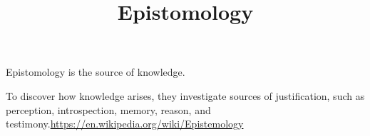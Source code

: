 \documentclass[a4paper]{article}
\title{Epistomology}
\date{}
\begin{document}
    \maketitle
    Epistomology is the source of knowledge.
    
    To discover how knowledge arises, they investigate sources of justification, such as perception, introspection, memory, reason, and testimony.\url{https://en.wikipedia.org/wiki/Epistemology}
\end{document}
